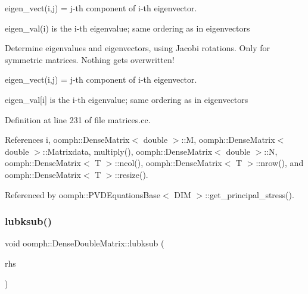 \begin{DoxyItemize}
\item {\ttfamily eigen\+\_\+vect(i,j)} = j-\/th component of i-\/th eigenvector.
\item {\ttfamily eigen\+\_\+val(i)} is the i-\/th eigenvalue; same ordering as in eigenvectors

Determine eigenvalues and eigenvectors, using Jacobi rotations. Only for symmetric matrices. Nothing gets overwritten!
\item {\ttfamily eigen\+\_\+vect(i,j)} = j-\/th component of i-\/th eigenvector.
\item {\ttfamily eigen\+\_\+val}\mbox{[}i\mbox{]} is the i-\/th eigenvalue; same ordering as in eigenvectors 
\end{DoxyItemize}

Definition at line 231 of file matrices.\+cc.



References i, oomph\+::\+Dense\+Matrix$<$ double $>$\+::M, oomph\+::\+Dense\+Matrix$<$ double $>$\+::\+Matrixdata, multiply(), oomph\+::\+Dense\+Matrix$<$ double $>$\+::N, oomph\+::\+Dense\+Matrix$<$ T $>$\+::ncol(), oomph\+::\+Dense\+Matrix$<$ T $>$\+::nrow(), and oomph\+::\+Dense\+Matrix$<$ T $>$\+::resize().



Referenced by oomph\+::\+P\+V\+D\+Equations\+Base$<$ D\+I\+M $>$\+::get\+\_\+principal\+\_\+stress().

\mbox{\label{classoomph_1_1DenseDoubleMatrix_a52515653ab5b792388258ca04e9dcbcc}} 
\subsubsection{\texorpdfstring{lubksub()}{lubksub()}\hspace{0.1cm}{\footnotesize\ttfamily [1/2]}}
{\footnotesize\ttfamily void oomph\+::\+Dense\+Double\+Matrix\+::lubksub (\begin{DoxyParamCaption}\item[{\hyperlink{classoomph_1_1DoubleVector}{Double\+Vector} \&}]{rhs }\end{DoxyParamCaption})\hspace{0.3cm}{\ttfamily [virtual]}}



